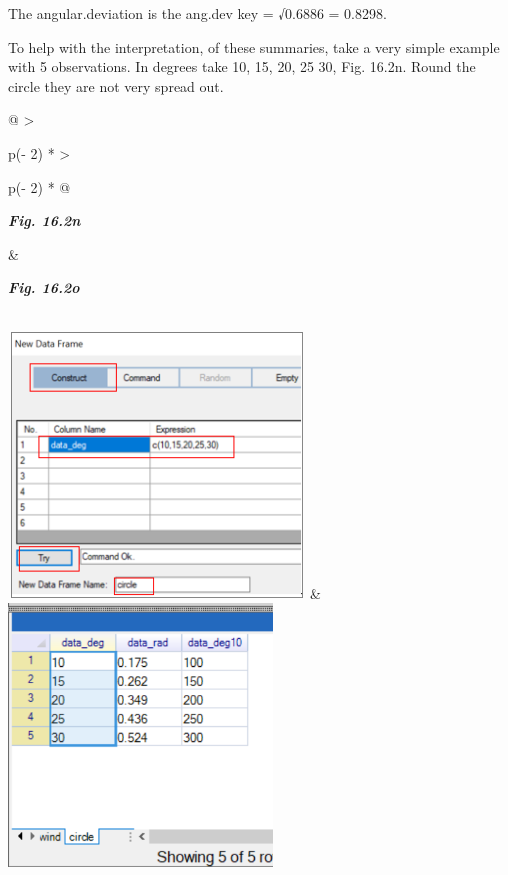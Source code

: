\documentclass[
  letterpaper,
  DIV=11,
  numbers=noendperiod]{scrreprt}
\begin{document}
The angular.deviation is the ang.dev key = √0.6886 = 0.8298.

To help with the interpretation, of these summaries, take a very simple
example with 5 observations. In degrees take 10, 15, 20, 25 30, Fig.
16.2n. Round the circle they are not very spread out.

\begin{longtable}[]{@{}
  >{\raggedright\arraybackslash}p{(\columnwidth - 2\tabcolsep) * }
  >{\raggedright\arraybackslash}p{(\columnwidth - 2\tabcolsep) * }@{}}
\toprule\noalign{}
\begin{minipage}[b]{\linewidth}\raggedright
\textbf{\emph{Fig. 16.2n}}
\end{minipage} & \begin{minipage}[b]{\linewidth}\raggedright
\textbf{\emph{Fig. 16.2o}}
\end{minipage} \\
\midrule\noalign{}
\endhead
\bottomrule\noalign{}
\endlastfoot
\includegraphics[width=3.09826in,height=2.77737in]{figures/Fig16.2n.png}
&
\includegraphics[width=2.75709in,height=2.75709in]{figures/Fig16.2o.png} \\
\end{longtable}
\end{document}
